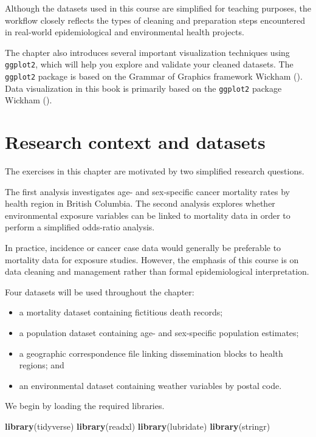 \documentclass[
  11pt,
  oneside]{book}
\newenvironment{Shaded}{\begin{snugshade}}{\end{snugshade}}
\newcommand{\FunctionTok}[1]{\textcolor[rgb]{0.13,0.29,0.53}{\textbf{#1}}}
\newcommand{\NormalTok}[1]{#1}
\providecommand{\tightlist}{%
  \setlength{\itemsep}{0pt}\setlength{\parskip}{0pt}}
\begin{document}
Although the datasets used in this course are simplified for teaching purposes, the workflow closely reflects the types of cleaning and preparation steps encountered in real-world epidemiological and environmental health projects.

The chapter also introduces several important visualization techniques using \texttt{ggplot2}, which will help you explore and validate your cleaned datasets. The \texttt{ggplot2} package is based on the Grammar of Graphics framework Wickham (). Data visualization in this book is primarily based on the \texttt{ggplot2} package Wickham ().

\section{Research context and datasets}\label{research-context-and-datasets}

The exercises in this chapter are motivated by two simplified research questions.

The first analysis investigates age- and sex-specific cancer mortality rates by health region in British Columbia. The second analysis explores whether environmental exposure variables can be linked to mortality data in order to perform a simplified odds-ratio analysis.

In practice, incidence or cancer case data would generally be preferable to mortality data for exposure studies. However, the emphasis of this course is on data cleaning and management rather than formal epidemiological interpretation.

Four datasets will be used throughout the chapter:

\begin{itemize}
\tightlist
\item
  a mortality dataset containing fictitious death records;
\item
  a population dataset containing age- and sex-specific population estimates;
\item
  a geographic correspondence file linking dissemination blocks to health regions; and
\item
  an environmental dataset containing weather variables by postal code.
\end{itemize}

We begin by loading the required libraries.

\begin{Shaded}
\begin{Highlighting}[]
\FunctionTok{library}\NormalTok{(tidyverse)}
\FunctionTok{library}\NormalTok{(readxl)}
\FunctionTok{library}\NormalTok{(lubridate)}
\FunctionTok{library}\NormalTok{(stringr)}
\end{Highlighting}
\end{Shaded}
\end{document}
